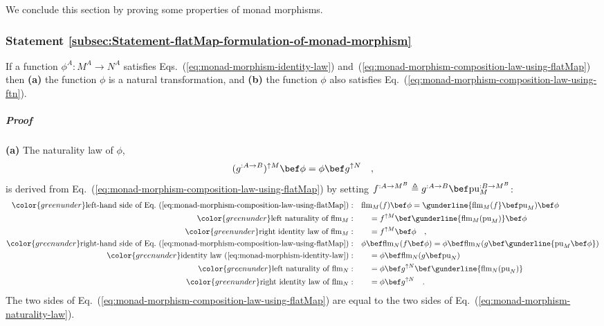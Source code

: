 We conclude this section by proving some properties of monad morphisms.

\subsubsection{Statement \label{subsec:Statement-flatMap-formulation-of-monad-morphism}\ref{subsec:Statement-flatMap-formulation-of-monad-morphism}}

If a function $\phi^{A}:M^{A}\rightarrow N^{A}$ satisfies Eqs.~(\ref{eq:monad-morphism-identity-law})
and~(\ref{eq:monad-morphism-composition-law-using-flatMap}) then
\textbf{(a)} the function $\phi$ is a natural transformation, and
\textbf{(b)} the function $\phi$ also satisfies Eq.~(\ref{eq:monad-morphism-composition-law-using-ftn}).

\subparagraph{Proof}

\textbf{(a)} The naturality law of $\phi$,
\begin{equation}
(g^{:A\rightarrow B})^{\uparrow M}\bef\phi=\phi\bef g^{\uparrow N}\quad,\label{eq:monad-morphism-naturality-law}
\end{equation}
is derived from Eq.~(\ref{eq:monad-morphism-composition-law-using-flatMap})
by setting $f^{:A\rightarrow M^{B}}\triangleq g^{:A\rightarrow B}\bef\text{pu}_{M}^{:B\rightarrow M^{B}}$:
\begin{align*}
{\color{greenunder}\text{left-hand side of Eq.~(\ref{eq:monad-morphism-composition-law-using-flatMap})}:}\quad & \text{flm}_{M}(f)\bef\phi=\gunderline{\text{flm}_{M}(f}\bef\text{pu}_{M})\bef\phi\\
{\color{greenunder}\text{left naturality of }\text{flm}_{M}:}\quad & \quad=f^{\uparrow M}\bef\gunderline{\text{flm}_{M}(\text{pu}_{M})}\bef\phi\\
{\color{greenunder}\text{right identity law of }\text{flm}_{M}:}\quad & \quad=f^{\uparrow M}\bef\phi\quad,\\
{\color{greenunder}\text{right-hand side of Eq.~(\ref{eq:monad-morphism-composition-law-using-flatMap})}:}\quad & \phi\bef\text{flm}_{N}(f\bef\phi)=\phi\bef\text{flm}_{N}(g\bef\gunderline{\text{pu}_{M}\bef\phi})\\
{\color{greenunder}\text{identity law~(\ref{eq:monad-morphism-identity-law})}:}\quad & \quad=\phi\bef\text{flm}_{N}(g\bef\text{pu}_{N})\\
{\color{greenunder}\text{left naturality of }\text{flm}_{N}:}\quad & \quad=\phi\bef g^{\uparrow N}\bef\gunderline{\text{flm}_{N}(\text{pu}_{N})}\\
{\color{greenunder}\text{right identity law of }\text{flm}_{N}:}\quad & \quad=\phi\bef g^{\uparrow N}\quad.
\end{align*}
The two sides of Eq.~(\ref{eq:monad-morphism-composition-law-using-flatMap})
are equal to the two sides of Eq.~(\ref{eq:monad-morphism-naturality-law}).

